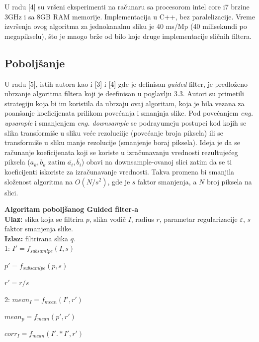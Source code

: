 \documentclass[a4paper,12pt,titlepage]{article}
\begin{document}
U radu [4] su vršeni eksperimenti na računaru sa procesorom intel core i7 brzine 3GHz i sa 8GB RAM memorije. Implementacija u C++, bez paralelizacije. Vreme izvršenja ovog algoritma za jednokanalnu sliku je 40 ms/Mp (40 milisekundi po megapikselu), što je mnogo brže od bilo koje druge implementacije sličnih filtera.  

\subsection{Poboljšanje}%

U radu [5], istih autora kao i [3] i [4] gde je definisan \emph{guided} filter, je predloženo ubrzanje algoritma filtera koji je deefinisan u poglavlju 3.3. Autori su primetili strategiju koja bi im koristila da ubrzaju ovaj algoritam, koja je bila vezana za poanšanje koeficijenata prilikom povećanja i smanjnja slike. Pod povećanjem \emph{eng. upsample} i smanjenjem \emph{eng. downsample} se podrayumeju postupci kod kojih se slika transformiše u sliku veće rezoluciije (povećanje broja piksela) ili se transformiše u sliku manje rezolucije (smanjenje boraj piksela). Ideja je da se računanje koeficijenata koji se koriste u izračunavanju vrednosti rezultujećeg piksela ($a_k, b_k$ zatim $\overline{a_i}, \overline{b_i}$) obavi na downsample-ovanoj slici zatim da se ti koeficijenti iskoriste za izračunavanje vrednosti. Takva promena bi smanjila složenost algoritma na $O(N / s^2)$, gde je $s$ faktor smanjenja, a $N$ broj piksela na slici. 

\textbf{Algoritam poboljšanog Guided filter-a}\\

\textbf{Ulaz:} slika koja se filtrira $p$, slika vodič $I$, radius $r$, parametar regularizacije $\varepsilon$, $s$ faktor smanjenja slike.\\

\textbf{Izlaz:} filtrirana slika $q$.\\

1: $I' = f_{subsamlpe}(I, s)$

\hspace{4mm} $p' = f_{subsamlpe}(p, s)$

\hspace{4mm} $r' = r / s$

2: $mean_I = f_{mean}(I', r')$

\hspace{4mm} $mean_p = f_{mean}(p', r')$

\hspace{4mm} $corr_I = f_{mean}(I' .* I', r')$
\end{document}

